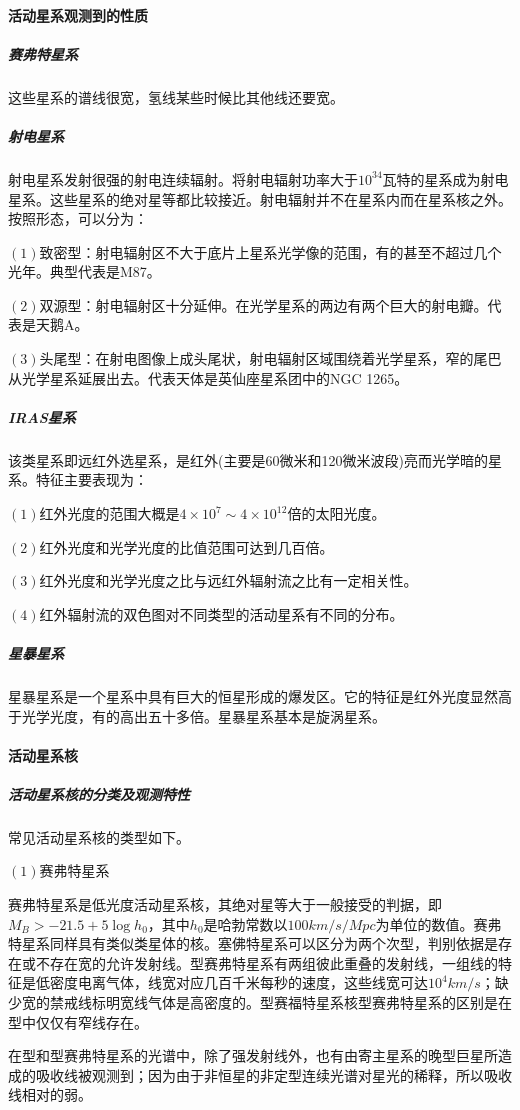 \paragraph{活动星系观测到的性质}
\subparagraph{赛弗特星系}这些星系的谱线很宽，氢线某些时候比其他线还要宽。
\subparagraph{射电星系}射电星系发射很强的射电连续辐射。将射电辐射功率大于$10^{34}$瓦特的星系成为射电星系。这些星系的绝对星等都比较接近。射电辐射并不在星系内而在星系核之外。按照形态，可以分为：

$\left(1\right)$致密型：射电辐射区不大于底片上星系光学像的范围，有的甚至不超过几个光年。典型代表是M87。

$\left(2\right)$双源型：射电辐射区十分延伸。在光学星系的两边有两个巨大的射电瓣。代表是天鹅A。

$\left(3\right)$头尾型：在射电图像上成头尾状，射电辐射区域围绕着光学星系，窄的尾巴从光学星系延展出去。代表天体是英仙座星系团中的NGC 1265。
\subparagraph{IRAS星系}该类星系即远红外选星系，是红外(主要是60微米和120微米波段)亮而光学暗的星系。特征主要表现为：

$\left(1\right)$红外光度的范围大概是$4\times10^7\sim4\times10^{12}$倍的太阳光度。

$\left(2\right)$红外光度和光学光度的比值范围可达到几百倍。

$\left(3\right)$红外光度和光学光度之比与远红外辐射流之比有一定相关性。

$\left(4\right)$红外辐射流的双色图对不同类型的活动星系有不同的分布。
\subparagraph{星暴星系}星暴星系是一个星系中具有巨大的恒星形成的爆发区。它的特征是红外光度显然高于光学光度，有的高出五十多倍。星暴星系基本是旋涡星系。
\paragraph{活动星系核}
\subparagraph{活动星系核的分类及观测特性}常见活动星系核的类型如下。

$\left(1\right)$赛弗特星系

赛弗特星系是低光度活动星系核，其绝对星等大于一般接受的判据，即$M_{B}>-21.5+5\log h_{0}$，其中$h_{0}$是哈勃常数以$100km/s/Mpc$为单位的数值。赛弗特星系同样具有类似类星体的核。塞佛特星系可以区分为两个次型，判别依据是存在或不存在宽的允许发射线。型赛弗特星系有两组彼此重叠的发射线，一组线的特征是低密度电离气体，线宽对应几百千米每秒的速度，这些线宽可达$10^4km/s$；缺少宽的禁戒线标明宽线气体是高密度的。型赛福特星系核型赛弗特星系的区别是在型中仅仅有窄线存在。

在型和型赛弗特星系的光谱中，除了强发射线外，也有由寄主星系的晚型巨星所造成的吸收线被观测到；因为由于非恒星的非定型连续光谱对星光的稀释，所以吸收线相对的弱。

